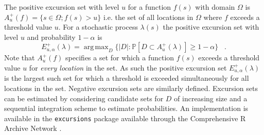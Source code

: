 \documentclass[preprint,12pt]{elsarticle}
\DeclareMathOperator*{\argmax}{arg\,max}  %
\begin{document}
The positive excursion set with level $u$ for a function $f(s)$ with domain $\Omega$ is $A_u^{+}(f) = \{ s \in \Omega ; f(s) > u \}$ i.e. the set of all locations in $\Omega$ where $f$ exceeds a threshold value $u$. For a stochastic process $\lambda(s)$ the positive excursion set with level $u$ and probability $1 - \alpha$ is
\begin{equation*}
E_{u,\alpha}^{+}(\lambda) = \argmax_{D}\{\lvert D \rvert : \mathbb{P}\left[D \subset A_u^{+}(\lambda)\right] \geq 1 - \alpha \} \;\;\; .
\end{equation*}
Note that $A_u^{+}(f)$ specifies a set for which a function $f(s)$ exceeds a threshold value $u$ for \textit{every location} in the set.  As such the positive excursion set $E_{u,\alpha}^{+}(\lambda)$ is the largest such set for which a threshold is exceeded simultaneously for all locations in the set.  Negative excursion sets are similarly defined.  Excursion sets can be estimated by considering candidate sets for $D$ of increasing size and a sequential integration scheme to estimate probabilities.  An implementation is available in the \texttt{excursions} package \citep{bolin_calculating_2018} available through the Comprehensive R Archive Network \citep{r_2017}.
\end{document}
